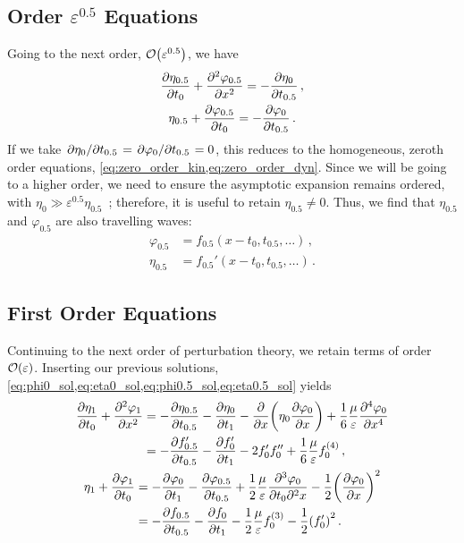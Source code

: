 \documentclass{jfm}
\let\Oldsubsection\subsection
\renewcommand{\subsection}{\FloatBarrier\Oldsubsection}
\renewcommand*{\epsilon}{\varepsilon}
\begin{document}
\subsection{Order \texorpdfstring{$\epsilon^{0.5}$}{0.5} Equations}
Going to the next order, $\order{\epsilon^{0.5}}$, we have
\begin{gather}
  \pdv{\eta_{0.5}}{t_0} + \pdv[2]{\varphi_{0.5}}{x} =
  -\pdv{\eta_0}{t_{0.5}} \,, \\
  \eta_{0.5} + \pdv{\varphi_{0.5}}{t_0} = -\pdv{\varphi_0}{t_{0.5}}\,.
\end{gather}
If we take $\pdv*{\eta_0}{t_{0.5}} = \pdv*{\varphi_0}{t_{0.5}} = 0$,
this reduces to the homogeneous, zeroth order equations,
\cref{eq:zero_order_kin,eq:zero_order_dyn}.
Since we will be going to a higher order, we need to ensure the
asymptotic expansion remains ordered, with $\eta_0 \gg \epsilon^{0.5}
\eta_{0.5}$~\citep{ott1969nonlinear}; therefore, it is useful to
retain $\eta_{0.5} \neq 0$.
Thus, we find that $\eta_{0.5}$ and $\varphi_{0.5}$ are also travelling
waves:
\begin{align}
  \varphi_{0.5} &= f_{0.5}(x-t_0,t_{0.5},\ldots) \,,
    \label{eq:phi0.5_sol} \\
  \eta_{0.5} &= f_{0.5}'(x-t_0,t_{0.5},\ldots) \,.
    \label{eq:eta0.5_sol}
\end{align}

\subsection{First Order Equations}
Continuing to the next order of perturbation theory, we retain terms of
order $\order{\epsilon}$.
Inserting our previous solutions,
\cref{eq:phi0_sol,eq:eta0_sol,eq:phi0.5_sol,eq:eta0.5_sol} yields
\begin{gather}
  \begin{aligned}
    \pdv{\eta_1}{t_0} + \pdv[2]{\varphi_{1}}{x} &=
      -\pdv{\eta_{0.5}}{t_{0.5}}
      -\pdv{\eta_0}{t_1} - \pdv{x} \pqty{\eta_0 \pdv{\varphi_0}{x}} +
      \frac{1}{6} \frac{\mu}{\epsilon} \pdv[4]{\varphi_0}{x} \\
    &= -\pdv{f_{0.5}'}{t_{0.5}} -\pdv{f_0'}{t_1} - 2 f_0' f_0'' +
      \frac{1}{6} \frac{\mu}{\epsilon} f_0^{(4)} \,,
  \end{aligned}
  \\
  \begin{aligned}
    \eta_1 + \pdv{\varphi_1}{t_0} &= -\pdv{\varphi_0}{t_1}
      - \pdv{\varphi_{0.5}}{t_{0.5}}
      + \frac{1}{2} \frac{\mu}{\epsilon} \frac{\partial^3 \varphi_0}
        {\partial t_0 \partial^2 x}
      - \frac{1}{2} \pqty{ \pdv{\varphi_0}{x} }^2 \\
      &= -\pdv{f_{0.5}}{t_{0.5}} -\pdv{f_0}{t_1} - \frac{1}{2}
        \frac{\mu}{\epsilon} f_0^{(3)} -
        \frac{1}{2} \pqty{f_0'}^2 \,.
  \end{aligned}
\end{gather}
\end{document}

